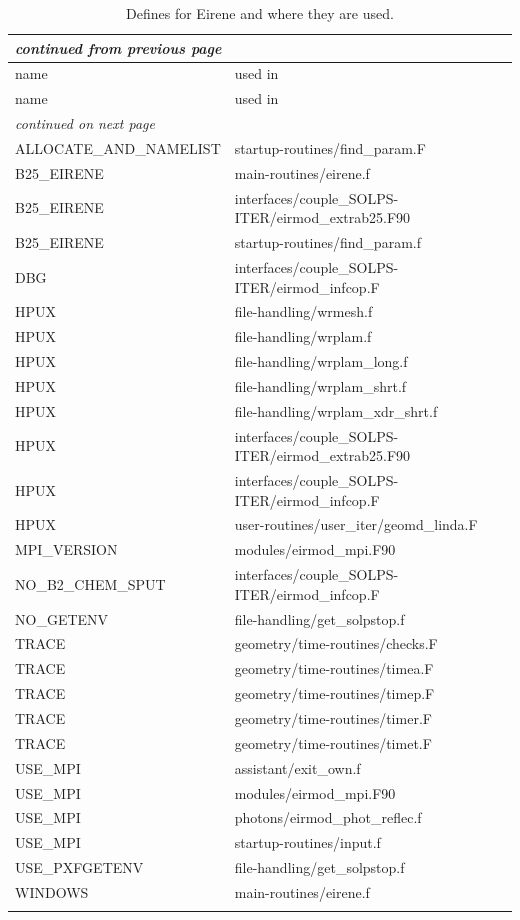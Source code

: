 \documentclass[a4paper,10pt]{report}
\begin{document}
\begin{center}
  \begin{longtable}{|l|l|}
    \hline
    \multicolumn{2}{|l|}{\small\sl continued from previous page} \\
    \hline name & used in \\
    \hline \endhead
    \hline name & used in \\
    \hline \endfirsthead
    \hline
    \multicolumn{2}{|l|}{\small\sl continued on next page} \\
    \hline \endfoot
    \endlastfoot
ALLOCATE\_AND\_NAMELIST & startup-routines/find\_param.F \\
B25\_EIRENE & main-routines/eirene.f \\
B25\_EIRENE & interfaces/couple\_SOLPS-ITER/eirmod\_extrab25.F90 \\
B25\_EIRENE & startup-routines/find\_param.f \\
DBG & interfaces/couple\_SOLPS-ITER/eirmod\_infcop.F \\
HPUX & file-handling/wrmesh.f \\
HPUX & file-handling/wrplam.f \\
HPUX & file-handling/wrplam\_long.f \\
HPUX & file-handling/wrplam\_shrt.f \\
HPUX & file-handling/wrplam\_xdr\_shrt.f \\
HPUX & interfaces/couple\_SOLPS-ITER/eirmod\_extrab25.F90 \\
HPUX & interfaces/couple\_SOLPS-ITER/eirmod\_infcop.F \\
HPUX & user-routines/user\_iter/geomd\_linda.F \\
MPI\_VERSION & modules/eirmod\_mpi.F90 \\
NO\_B2\_CHEM\_SPUT & interfaces/couple\_SOLPS-ITER/eirmod\_infcop.F \\
NO\_GETENV & file-handling/get\_solpstop.f \\
TRACE & geometry/time-routines/checks.F \\
TRACE & geometry/time-routines/timea.F \\
TRACE & geometry/time-routines/timep.F \\
TRACE & geometry/time-routines/timer.F \\
TRACE & geometry/time-routines/timet.F \\
USE\_MPI & assistant/exit\_own.f \\
USE\_MPI & modules/eirmod\_mpi.F90 \\
USE\_MPI & photons/eirmod\_phot\_reflec.f \\
USE\_MPI & startup-routines/input.f \\
USE\_PXFGETENV & file-handling/get\_solpstop.f \\
WINDOWS & main-routines/eirene.f \\
    \hline
    \caption{Defines for Eirene and where they are used.}
    \label{tab:Eirdefines}
  \end{longtable}
\end{center}
\end{document}
